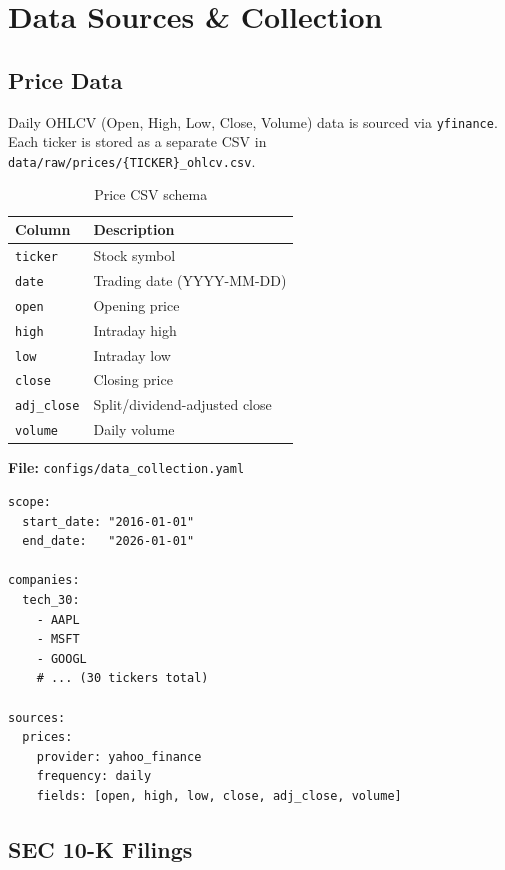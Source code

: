 \documentclass[12pt, a4paper]{article}
\begin{document}
\section{Data Sources \& Collection}

\subsection{Price Data}
\label{sec:price-data}

Daily OHLCV (Open, High, Low, Close, Volume) data is sourced via \texttt{yfinance}.  Each ticker is stored as a separate CSV in \texttt{data/raw/prices/\{TICKER\}\_ohlcv.csv}.

\begin{table}[H]
\centering
\caption{Price CSV schema}
\begin{tabular}{ll}
\toprule
\textbf{Column} & \textbf{Description} \\
\midrule
\texttt{ticker}    & Stock symbol \\
\texttt{date}      & Trading date (YYYY-MM-DD) \\
\texttt{open}      & Opening price \\
\texttt{high}      & Intraday high \\
\texttt{low}       & Intraday low \\
\texttt{close}     & Closing price \\
\texttt{adj\_close} & Split/dividend-adjusted close \\
\texttt{volume}    & Daily volume \\
\bottomrule
\end{tabular}
\end{table}

\noindent\textbf{File:} \texttt{configs/data\_collection.yaml}

\begin{lstlisting}[caption={Data collection configuration (excerpt)}]
scope:
  start_date: "2016-01-01"
  end_date:   "2026-01-01"

companies:
  tech_30:
    - AAPL
    - MSFT
    - GOOGL
    # ... (30 tickers total)

sources:
  prices:
    provider: yahoo_finance
    frequency: daily
    fields: [open, high, low, close, adj_close, volume]
\end{lstlisting}

\subsection{SEC 10-K Filings}
\end{document}
